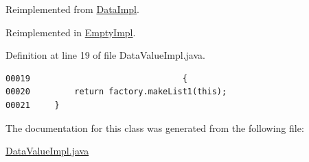 Reimplemented from \hyperlink{classDataImpl_a1}{Data\-Impl}.

Reimplemented in \hyperlink{classEmptyImpl_a1}{Empty\-Impl}.

Definition at line 19 of file Data\-Value\-Impl.java.\footnotesize\begin{verbatim}00019                               {
00020         return factory.makeList1(this);
00021     }
\end{verbatim}\normalsize 


The documentation for this class was generated from the following file:\begin{CompactItemize}
\item 
\hyperlink{DataValueImpl_8java-source}{Data\-Value\-Impl.java}\end{CompactItemize}

